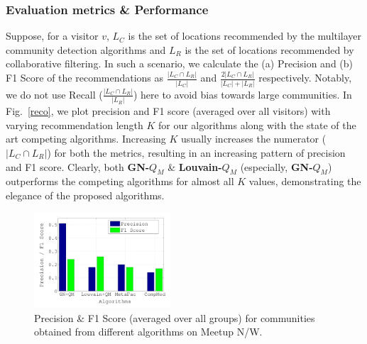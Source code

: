 \subsubsection{Evaluation metrics \& Performance}
Suppose, for a visitor $v$, $L_C$ is the set of locations recommended by the multilayer community detection algorithms and
 $L_R$ is the set of locations recommended by collaborative filtering. In such a scenario, we calculate the (a) Precision
 and (b) F1 Score of the recommendations as $\frac{\left\vert L_C \cap L_R \right\vert}{\left\vert L_C \right\vert}$ and
 $\frac{2 \left\vert L_C \cap L_R \right\vert}{\left\vert L_C \right\vert + \left\vert L_R \right\vert}$
 respectively. Notably, we do not use Recall ($\frac{\left\vert L_C \cap L_R \right\vert}{\left\vert L_R \right\vert}$) here to avoid bias 
 towards large communities.
%
In Fig.~\ref{reco}, we plot precision and F1 score (averaged over all visitors) with varying recommendation length $K$ for our algorithms 
along
with the state of the art competing algorithms. Increasing $K$ usually increases the
numerator ($\left\vert L_C \cap L_R \right\vert$) for both the
metrics, resulting in an increasing pattern of precision and F1 score.
Clearly, both \textbf{GN-$Q_M$} \& \textbf{Louvain-$Q_M$} (especially, \textbf{GN-$Q_M$}) outperforms the competing algorithms for
almost all $K$ values, demonstrating the elegance of the proposed algorithms.


\begin{figure}
\centering
\includegraphics[width=2in]{./images/Meetup_precision_no_mq.pdf}
\vspace{-0.2in}
\caption{Precision \& F1 Score (averaged over all groups) for communities obtained from different algorithms on Meetup N/W.}
\vspace{-0.2in}
\label{meetup}
\end{figure}

